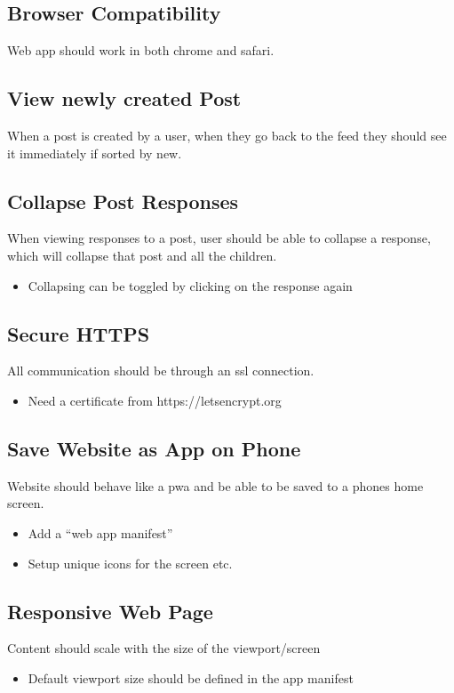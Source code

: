 \documentclass[12pt]{article}
\begin{document}
\subsection{Browser Compatibility}
Web app should work in both chrome and safari.

\subsection{View newly created Post}
When a post is created by a user, when they go back to the feed they should see
it immediately if sorted by new.

\subsection{Collapse Post Responses}
When viewing responses to a post, user should be able to collapse a response,
which will collapse that post and all the children.
\begin{itemize}
  \item Collapsing can be toggled by clicking on the response again
\end{itemize}

\subsection{Secure HTTPS}
All communication should be through an ssl connection.
\begin{itemize}
  \item Need a certificate from https://letsencrypt.org
\end{itemize}

\subsection{Save Website as App on Phone}
Website should behave like a pwa and be able to be saved to a phones home screen.
\begin{itemize}
  \item Add a “web app manifest”
  \item Setup unique icons for the screen etc.
\end{itemize}

\subsection{Responsive Web Page}
Content should scale with the size of the viewport/screen
\begin{itemize}
  \item Default viewport size should be defined in the app manifest
\end{itemize}
\end{document}
